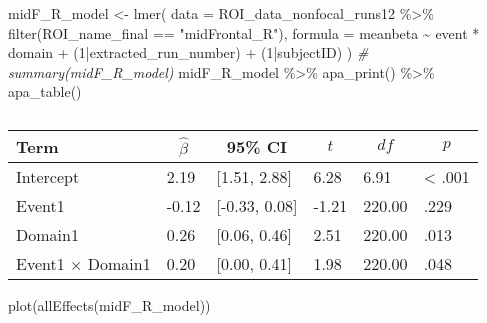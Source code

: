 \documentclass[
]{article}
\newenvironment{Shaded}{\begin{snugshade}}{\end{snugshade}}
\newcommand{\AttributeTok}[1]{\textcolor[rgb]{0.77,0.63,0.00}{#1}}
\newcommand{\CommentTok}[1]{\textcolor[rgb]{0.56,0.35,0.01}{\textit{#1}}}
\newcommand{\DecValTok}[1]{\textcolor[rgb]{0.00,0.00,0.81}{#1}}
\newcommand{\FunctionTok}[1]{\textcolor[rgb]{0.00,0.00,0.00}{#1}}
\newcommand{\NormalTok}[1]{#1}
\newcommand{\OtherTok}[1]{\textcolor[rgb]{0.56,0.35,0.01}{#1}}
\newcommand{\SpecialCharTok}[1]{\textcolor[rgb]{0.00,0.00,0.00}{#1}}
\newcommand{\StringTok}[1]{\textcolor[rgb]{0.31,0.60,0.02}{#1}}
\begin{document}
\begin{Shaded}
\begin{Highlighting}[]
\NormalTok{midF\_R\_model }\OtherTok{\textless{}{-}} \FunctionTok{lmer}\NormalTok{(}
      \AttributeTok{data =}\NormalTok{ ROI\_data\_nonfocal\_runs12 }\SpecialCharTok{\%\textgreater{}\%}
        \FunctionTok{filter}\NormalTok{(ROI\_name\_final }\SpecialCharTok{==} \StringTok{"midFrontal\_R"}\NormalTok{),}
      \AttributeTok{formula =}\NormalTok{ meanbeta }\SpecialCharTok{\textasciitilde{}}\NormalTok{ event }\SpecialCharTok{*}\NormalTok{ domain }\SpecialCharTok{+}\NormalTok{ (}\DecValTok{1}\SpecialCharTok{|}\NormalTok{extracted\_run\_number) }\SpecialCharTok{+}\NormalTok{ (}\DecValTok{1}\SpecialCharTok{|}\NormalTok{subjectID)}
\NormalTok{    )}
\CommentTok{\# summary(midF\_R\_model)}
\NormalTok{midF\_R\_model }\SpecialCharTok{\%\textgreater{}\%}
  \FunctionTok{apa\_print}\NormalTok{() }\SpecialCharTok{\%\textgreater{}\%}
  \FunctionTok{apa\_table}\NormalTok{()}
\end{Highlighting}
\end{Shaded}

\begin{table}[tbp]

\begin{center}
\begin{threeparttable}

\caption{\label{tab:unnamed-chunk-21}}

\begin{tabular}{llllll}
\toprule
Term & \multicolumn{1}{c}{$\hat{\beta}$} & \multicolumn{1}{c}{95\% CI} & \multicolumn{1}{c}{$t$} & \multicolumn{1}{c}{$\mathit{df}$} & \multicolumn{1}{c}{$p$}\\
\midrule
Intercept & 2.19 & {}[1.51, 2.88] & 6.28 & 6.91 & < .001\\
Event1 & -0.12 & {}[-0.33, 0.08] & -1.21 & 220.00 & .229\\
Domain1 & 0.26 & {}[0.06, 0.46] & 2.51 & 220.00 & .013\\
Event1 $\times$ Domain1 & 0.20 & {}[0.00, 0.41] & 1.98 & 220.00 & .048\\
\bottomrule
\end{tabular}

\end{threeparttable}
\end{center}

\end{table}

\begin{Shaded}
\begin{Highlighting}[]
\FunctionTok{plot}\NormalTok{(}\FunctionTok{allEffects}\NormalTok{(midF\_R\_model))}
\end{Highlighting}
\end{Shaded}
\end{document}
